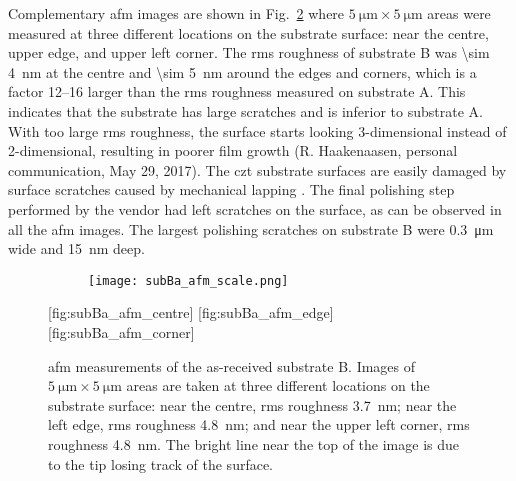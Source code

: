 Complementary \ac{afm} images are shown in Fig.~\ref{fig:subBa_afm} where $\SI{5}{\micro\metre}\times\SI{5}{\micro\metre}$ areas were measured at three different locations on the substrate surface: near the centre, upper edge, and upper left corner. The \ac{rms} roughness of substrate B was \SI{\sim 4}{\nano\metre} at the centre and \SI{\sim 5}{\nano\metre} around the edges and corners, which is a factor \SIrange{12}{16}{} larger than the \ac{rms} roughness measured on substrate A. This indicates that the substrate has large scratches and is inferior to substrate A. With too large \ac{rms} roughness, the surface starts looking 3-dimensional instead of 2-dimensional, resulting in poorer film growth (R. Haakenaasen, personal communication, May 29, 2017). The \ac{czt} substrate surfaces are easily damaged by surface scratches caused by mechanical lapping \citep{egan2009scanning}. The final polishing step performed by the vendor had left scratches on the surface, as can be observed in all the \ac{afm} images. The largest polishing scratches on substrate B were \SI{0.3}{\micro\metre} wide and \SI{15}{\nano\metre} deep.

\begin{figure}[htbp]
    \centering
    \begin{subfigure}[c]{0.032\linewidth}
        \label{fig:subBa_afm_scale}\captionsetup{list=no}
        \texttt{[image: subBa\_afm\_scale.png]}
    \end{subfigure}
    \hfill
    [fig:subBa_afm_centre]
    \hfill
    [fig:subBa_afm_edge]
    \hfill
    [fig:subBa_afm_corner]
    \caption[\Ac{afm} of as-received substrate B.]{\Ac{afm} measurements of the as-received substrate B. Images of $\SI{5}{\micro\metre}\times\SI{5}{\micro\metre}$ areas are taken at three different locations on the substrate surface:  near the centre, \ac{rms} roughness \SI{3,7}{\nano\metre};  near the left edge, \ac{rms} roughness \SI{4,8}{\nano\metre}; and  near the upper left corner, \ac{rms} roughness \SI{4,8}{\nano\metre}. The bright line near the top of the image is due to the tip losing track of the surface.}\label{fig:subBa_afm}
\end{figure} %


